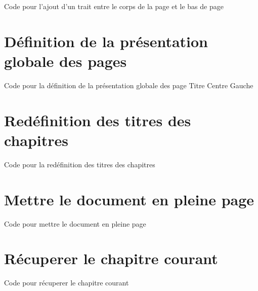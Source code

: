 \begin{Latex}{Code pour l'ajout d'un trait entre le corps de la page et le bas de page}
\end{Latex}





\section{Définition de la présentation globale des pages}

\begin{Latex}{Code pour la définition de la présentation globale des page}
  \addPresentation
  {Titre} {Centre} {\currentChapter}
  {Gauche} {} {\currentPage}
\end{Latex}

\section{Redéfinition des titres des chapitres}

\begin{Latex}{Code pour la redéfinition des titres des chapitres}
\end{Latex}


\section{Mettre le document en pleine page}
\begin{Latex}{Code pour mettre le document en pleine page}
\setFullPage
\end{Latex}

\section{Récuperer le chapitre courant}
\begin{Latex}{Code pour récuperer le chapitre courant}
\currentChapter
\end{Latex}
